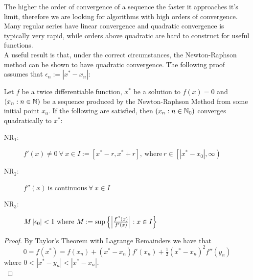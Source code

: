 \begin{Uniform Convergence Thm}
The higher the order of convergence of a sequence the faster it approaches it's limit, therefore we are looking for algorithms with high orders of convergence. Many regular series have linear convergence and quadratic convergence is typically very rapid, while orders above quadratic are hard to construct for useful functions.\\

A useful result is that, under the correct circumstances, the Newton-Raphson method can be shown to have quadratic convergence. The following proof assumes that \(\epsilon_n := |x^\ast - x_n|\):

\begin{Quad Convergence of Newton}
\label{THM_"Quad Conv Newton"}
Let \(f\) be a twice differentiable function, \(x^\ast\) be a solution to \(f(x) = 0\) and \((x_n : n \in \mathbb{N})\) be a sequence produced by the Newton-Raphson Method from some initial point \(x_0\). If the following are satisfied, then \((x_n : n \in \mathbb{N}_0)\) converges quadratically to \(x^\ast\):
\begin{description}

\item[\(\textrm{NR}_1\):]
\begin{math}
	f'(x) \neq 0\  \forall\: x \in I := [x^\ast - r, x^\ast + r], \ \mathrm{where}\ r \in \left[\left|x^\ast - x_0\right|, \infty\right)
\end{math}

\item[\(\textrm{NR}_2\):]
\begin{math}
	f''(x) \ \textrm{is continuous}\  \forall\: x \in I
\end{math}

\item[\(\textrm{NR}_3\):]
\begin{math}
	M\left|\epsilon_0\right| < 1 \ \mathrm{where}\ M := \sup\left\{\left|\frac{f''(x)}{f'(x)}\right| : x \in I\right\}\\
\end{math}
\end{description}
\end{Quad Convergence of Newton}

\begin{proof}
By Taylor's Theorem with Lagrange Remainders\cite[][80]{BOK_Taylor} we have that
\begin{displaymath}
	0 = f(x^\ast) = f(x_n) + (x^\ast - x_n)f'(x_n) + \tfrac{1}{2}
		(x^\ast - x_n)^2f''(y_n)
\end{displaymath}
where \(0 < |x^\ast - y_n| < |x^\ast - x_n|\).\\


\end{proof}
\end{Uniform Convergence Thm}
